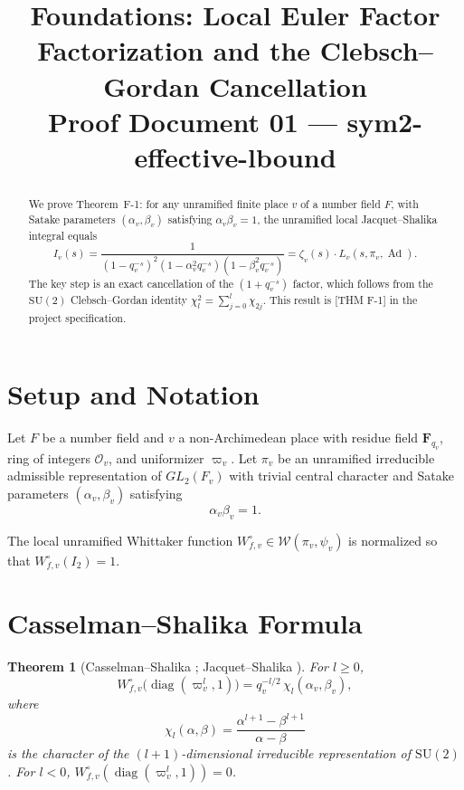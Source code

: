 \documentclass[12pt]{article}
\title{Foundations: Local Euler Factor Factorization and the Clebsch--Gordan Cancellation\\
\large Proof Document 01 --- sym2-effective-lbound}
\author{}
\date{}
\newtheorem{theorem}{Theorem}[section]
\DeclareMathOperator{\diag}{diag}
\DeclareMathOperator{\Ad}{Ad}
\newcommand{\calO}{\mathcal{O}}
\newcommand{\calW}{\mathcal{W}}
\begin{document}
\maketitle

\begin{abstract}
We prove Theorem~F-1: for any unramified finite place $v$ of a number field $F$,
with Satake parameters $(\alpha_v, \beta_v)$ satisfying $\alpha_v \beta_v = 1$,
the unramified local Jacquet--Shalika integral equals
\[
  I_v(s) = \frac{1}{(1-q_v^{-s})^2(1-\alpha_v^2 q_v^{-s})(1-\beta_v^2 q_v^{-s})}
          = \zeta_v(s) \cdot L_v(s, \pi_v, \Ad).
\]
The key step is an exact cancellation of the $(1+q_v^{-s})$ factor, which follows
from the $\mathrm{SU}(2)$ Clebsch--Gordan identity $\chi_l^2 = \sum_{j=0}^l \chi_{2j}$.
This result is [THM F-1] in the project specification.
\end{abstract}

\tableofcontents

\section{Setup and Notation}

Let $F$ be a number field and $v$ a non-Archimedean place with residue field
$\mathbf{F}_{q_v}$, ring of integers $\calO_v$, and uniformizer $\varpi_v$.
Let $\pi_v$ be an unramified irreducible admissible representation of $GL_2(F_v)$
with trivial central character and Satake parameters $(\alpha_v, \beta_v)$ satisfying
\begin{equation}\label{eq:satake-unit}
  \alpha_v \beta_v = 1.
\end{equation}

The local unramified Whittaker function $W_{f,v}^\circ \in \calW(\pi_v, \psi_v)$
is normalized so that $W_{f,v}^\circ(I_2) = 1$.

\section{Casselman--Shalika Formula}

\begin{theorem}[Casselman--Shalika {\cite[Theorem 5.4, p.~227]{CS80};
Jacquet--Shalika {\cite[Section 2.2, p.~511]{JS81}}}]\label{thm:CS}
For $l \geq 0$,
\[
  W_{f,v}^\circ\bigl(\diag(\varpi_v^l, 1)\bigr)
  = q_v^{-l/2}\, \chi_l(\alpha_v, \beta_v),
\]
where
\[
  \chi_l(\alpha, \beta)
  = \frac{\alpha^{l+1} - \beta^{l+1}}{\alpha - \beta}
\]
is the character of the $(l+1)$-dimensional irreducible representation of $\mathrm{SU}(2)$.
For $l < 0$, $W_{f,v}^\circ(\diag(\varpi_v^l, 1)) = 0$.
\end{theorem}
\end{document}
